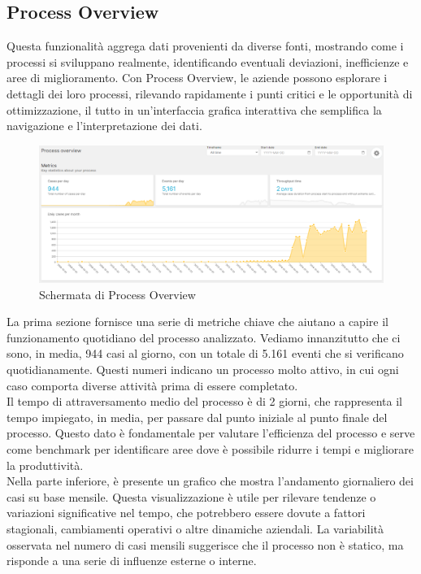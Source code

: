 \documentclass{article}
\begin{document}
\subsection{Process Overview}
Questa funzionalità aggrega dati provenienti da diverse fonti, mostrando come i processi si sviluppano realmente, identificando eventuali deviazioni, inefficienze e aree di miglioramento. Con Process Overview, le aziende possono esplorare i dettagli dei loro processi, rilevando rapidamente i punti critici e le opportunità di ottimizzazione, il tutto in un’interfaccia grafica interattiva che semplifica la navigazione e l'interpretazione dei dati.\\

\begin{figure}[H]
    \centering
    \includegraphics[width=\textwidth]{imgCelonis/DatiReali/ProcessOverview1.png}
    \caption{Schermata di Process Overview}
    \label{fig:schermata-Process-Overview}
\end{figure}

La prima sezione fornisce una serie di metriche chiave che aiutano a capire il funzionamento quotidiano del processo analizzato. Vediamo innanzitutto che ci sono, in media, 944 casi al giorno, con un totale di 5.161 eventi che si verificano quotidianamente. Questi numeri indicano un processo molto attivo, in cui ogni caso comporta diverse attività prima di essere completato.\\
Il tempo di attraversamento medio del processo è di 2 giorni, che rappresenta il tempo impiegato, in media, per passare dal punto iniziale al punto finale del processo. Questo dato è fondamentale per valutare l'efficienza del processo e serve come benchmark per identificare aree dove è possibile ridurre i tempi e migliorare la produttività.\\
Nella parte inferiore, è presente un grafico che mostra l'andamento giornaliero dei casi su base mensile. Questa visualizzazione è utile per rilevare tendenze o variazioni significative nel tempo, che potrebbero essere dovute a fattori stagionali, cambiamenti operativi o altre dinamiche aziendali. La variabilità osservata nel numero di casi mensili suggerisce che il processo non è statico, ma risponde a una serie di influenze esterne o interne.\\
\end{document}
